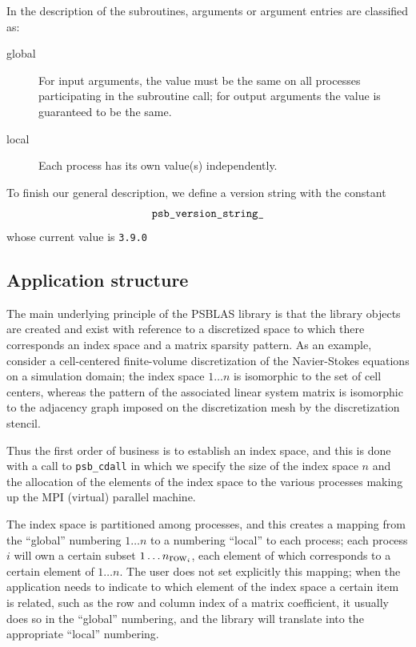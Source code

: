 In the description of the subroutines, arguments or argument entries
are classified as:
\begin{description}
\item[global] For input arguments, the value must be the same on all processes
  participating in the subroutine call; for output arguments the value
  is guaranteed to be the same.
\item[local] Each process has its own value(s) independently.
\end{description}
To finish our general description, we define a version string with the
constant 
\[ \verb|psb_version_string_|\]
whose current value is \verb|3.9.0|

\subsection{Application structure}
\label{sec:appstruct}

The main underlying principle of the PSBLAS library is that the
library objects are created and exist with reference to a discretized
space to which there corresponds an index space and a matrix sparsity
pattern. As an example, consider a cell-centered finite-volume
discretization of  the Navier-Stokes equations on a simulation domain;
the index space $1\dots n$ is isomorphic to the set of cell centers,
whereas the pattern of the associated linear system matrix is
isomorphic to the adjacency graph imposed on the discretization mesh
by the discretization stencil. 

Thus the first order of business is to establish an index space, and
this is done with a call to  \verb|psb_cdall| in which we specify the
size of the index space $n$ and the allocation of the elements of the
index space to the various processes making up the MPI (virtual)
parallel machine. 

The index space is partitioned among processes, and this creates a
mapping from the ``global'' numbering $1\dots n$ to a numbering
``local'' to each process; each process $i$ will own a certain subset
$1\dots n_{\hbox{row}_i}$, each element of which corresponds to a certain
element of $1\dots n$. The user does not set explicitly this mapping;
when the application needs to indicate to which element of the index
space a certain item is related, such as the row and column index of a
matrix coefficient, it usually does so in the ``global'' numbering, and the
library will translate into the appropriate ``local'' numbering. 

